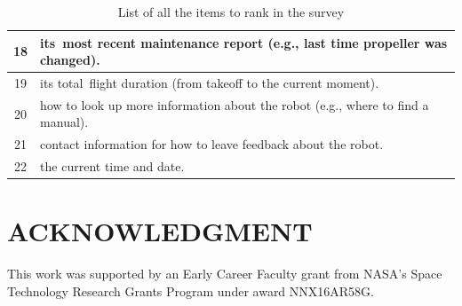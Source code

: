 \documentclass[letterpaper, 10 pt, conference]{ieeeconf}  %
\begin{document}
\begin {table}[h]
\begin{center}
\begin{tabular}{| c | l |}
\hline
18 &  its most recent maintenance report (e.g., last time propeller was changed).\\
\hline
19 &  its total flight duration (from takeoff to the current moment).\\
\hline
20 &  how to look up more information about the robot (e.g., where to find a manual).\\
\hline
21 &  contact information for how to leave feedback about the robot.\\
\hline
22 &  the current time and date.\\
\hline
\end{tabular}
\end{center}
\caption{List of all the items to rank in the survey}
\label{table:list}
\end{table}

\section*{ACKNOWLEDGMENT}
This work was supported by an Early Career Faculty grant from NASA's Space Technology Research Grants Program under award NNX16AR58G.




\end{document}

